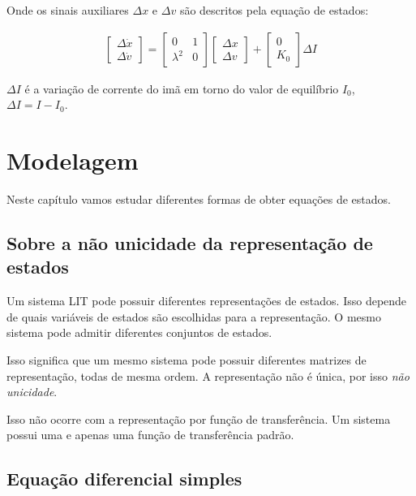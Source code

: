 \documentclass[
]{book}
\begin{document}
Onde os sinais auxiliares \(\Delta x\) e \(\Delta v\) são descritos pela equação de estados:

\begin{align}
\begin{bmatrix} \Delta\dot{x}\\ \Delta\dot{v}\end{bmatrix} = \begin{bmatrix}0 & 1 \\ \lambda^2 & 0\end{bmatrix}\begin{bmatrix}\Delta x\\ \Delta v\end{bmatrix} + \begin{bmatrix}0\\ K_0\end{bmatrix}\Delta I
\end{align}

\(\Delta I\) é a variação de corrente do imã em torno do valor de equilíbrio \(I_0\), \(\Delta I=I-I_0\).

\hypertarget{modelagem}{%
\chapter{Modelagem}\label{modelagem}}

Neste capítulo vamos estudar diferentes formas de obter equações de estados.

\hypertarget{sobre-a-nuxe3o-unicidade-da-representauxe7uxe3o-de-estados}{%
\section{Sobre a não unicidade da representação de estados}\label{sobre-a-nuxe3o-unicidade-da-representauxe7uxe3o-de-estados}}

Um sistema LIT pode possuir diferentes representações de estados. Isso depende de quais variáveis de estados são escolhidas para a representação. O mesmo sistema pode admitir diferentes conjuntos de estados.

Isso significa que um mesmo sistema pode possuir diferentes matrizes de representação, todas de mesma ordem. A representação não é única, por isso \emph{não unicidade}.

Isso não ocorre com a representação por função de transferência. Um sistema possui uma e apenas uma função de transferência padrão.

\hypertarget{equauxe7uxe3o-diferencial-simples}{%
\section{Equação diferencial simples}\label{equauxe7uxe3o-diferencial-simples}}
\end{document}
